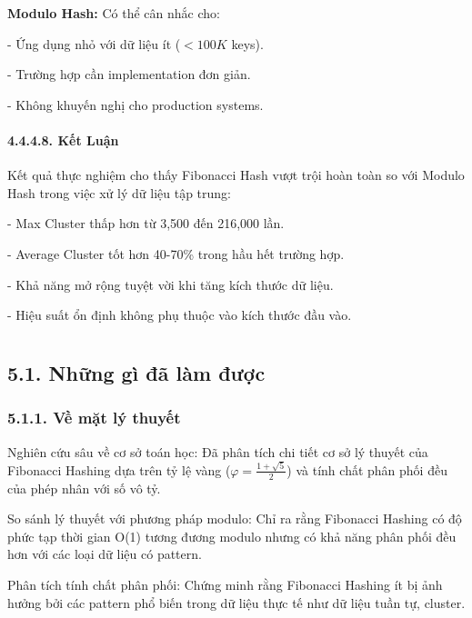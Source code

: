 \documentclass[12pt,a4paper]{report}
\begin{document}
\textbf{Modulo Hash:} Có thể cân nhắc cho:

    - Ứng dụng nhỏ với dữ liệu ít ($< 100K$ keys).
    
    - Trường hợp cần implementation đơn giản.
    
    - Không khuyến nghị cho production systems.

\subsubsection*{4.4.4.8. Kết Luận}

\noindent \indent Kết quả thực nghiệm cho thấy Fibonacci Hash vượt trội hoàn toàn so với Modulo Hash trong việc xử lý dữ liệu tập trung:

    - Max Cluster thấp hơn từ 3,500 đến 216,000 lần.
    
    - Average Cluster tốt hơn 40-70\% trong hầu hết trường hợp.
    
    - Khả năng mở rộng tuyệt vời khi tăng kích thước dữ liệu.
    
    - Hiệu suất ổn định không phụ thuộc vào kích thước đầu vào.

\newpage
\chapter*{}

\section*{5.1. Những gì đã làm được}
\subsection*{5.1.1. Về mặt lý thuyết}
\noindent \indent Nghiên cứu sâu về cơ sở toán học: Đã phân tích chi tiết cơ sở lý thuyết của Fibonacci Hashing dựa trên tỷ lệ vàng ($\varphi = \frac{1 + \sqrt{5}}{2}$) và tính chất phân phối đều của phép nhân với số vô tỷ.

So sánh lý thuyết với phương pháp modulo: Chỉ ra rằng Fibonacci Hashing có độ phức tạp thời gian O(1) tương đương modulo nhưng có khả năng phân phối đều hơn với các loại dữ liệu có pattern.

Phân tích tính chất phân phối: Chứng minh rằng Fibonacci Hashing ít bị ảnh hưởng bởi các pattern phổ biến trong dữ liệu thực tế như dữ liệu tuần tự, cluster.
\end{document}
